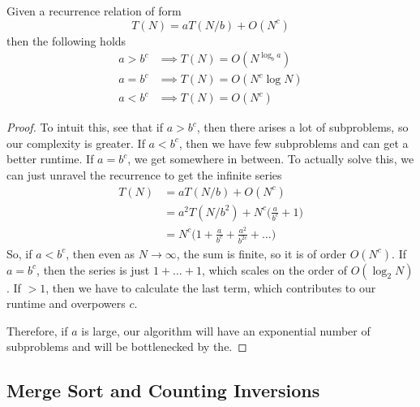 \documentclass{article}
\begin{document}
    \begin{theorem}
      Given a recurrence relation of form 
      \begin{equation}
        T(N) = a T(N/b) + O(N^c)
      \end{equation}
      then the following holds 
      \begin{align}
        a > b^c & \implies T(N) = O(N^{\log_b a}) \\
        a = b^c & \implies T(N) = O(N^c \log{N}) \\
        a < b^c & \implies T(N) = O(N^c) 
      \end{align}
    \end{theorem}
    \begin{proof}
      To intuit this, see that if $a > b^c$, then there arises a lot of subproblems, so our complexity is greater. If $a < b^c$, then we have few subproblems and can get a better runtime. If $a = b^c$, we get somewhere in between. To actually solve this, we can just unravel the recurrence to get the infinite series 
      \begin{align}
        T(N) & = a T(N/b) + O(N^c) \\
             & = a^2 T(N/b^2) +  N^c \bigg( \frac{a}{b^c} + 1 \bigg) \\
             & =  N^c \bigg( 1 + \frac{a}{b^c} + \frac{a^2}{b^{2c}} + \ldots \bigg)
      \end{align}
      So, if $a < b^c$, then even as $N \rightarrow \infty$, the sum is finite, so it is of order $O(N^c)$. If $a = b^c$, then the series is just $1 + \ldots + 1$, which scales on the order of $O(\log_2 {N})$. If $> 1$, then we have to calculate the last term, which contributes to our runtime and overpowers $c$.  
      
      Therefore, if $a$ is large, our algorithm will have an exponential number of subproblems and will be bottlenecked by the. 
    \end{proof}

  \subsection{Merge Sort and Counting Inversions}
\end{document}
